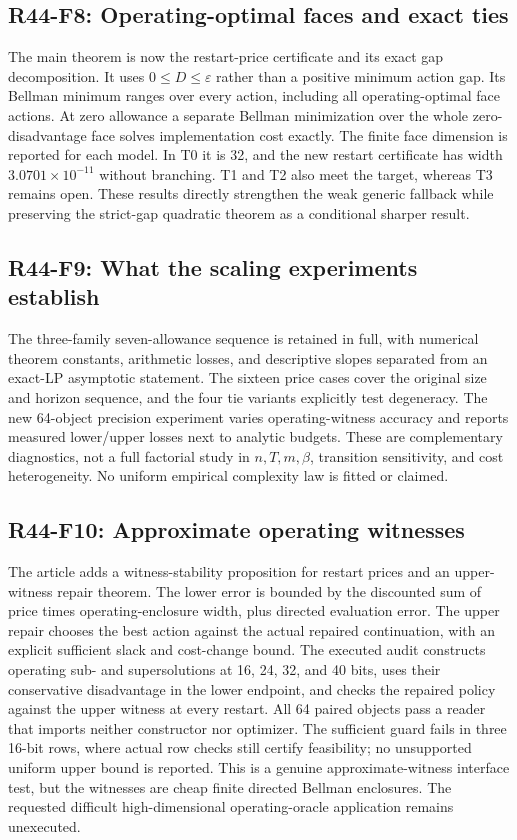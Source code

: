 \subsection{R44-F8: Operating-optimal faces and exact ties}
The main theorem is now the restart-price certificate and its exact gap decomposition. It uses $0\le D\le\varepsilon$ rather than a positive minimum action gap. Its Bellman minimum ranges over every action, including all operating-optimal face actions. At zero allowance a separate Bellman minimization over the whole zero-disadvantage face solves implementation cost exactly. The finite face dimension is reported for each model. In T0 it is 32, and the new restart certificate has width $3.0701\times10^{-11}$ without branching. T1 and T2 also meet the target, whereas T3 remains open. These results directly strengthen the weak generic fallback while preserving the strict-gap quadratic theorem as a conditional sharper result.

\subsection{R44-F9: What the scaling experiments establish}
The three-family seven-allowance sequence is retained in full, with numerical theorem constants, arithmetic losses, and descriptive slopes separated from an exact-LP asymptotic statement. The sixteen price cases cover the original size and horizon sequence, and the four tie variants explicitly test degeneracy. The new 64-object precision experiment varies operating-witness accuracy and reports measured lower/upper losses next to analytic budgets. These are complementary diagnostics, not a full factorial study in $n,T,m,\beta$, transition sensitivity, and cost heterogeneity. No uniform empirical complexity law is fitted or claimed.

\subsection{R44-F10: Approximate operating witnesses}
The article adds a witness-stability proposition for restart prices and an upper-witness repair theorem. The lower error is bounded by the discounted sum of price times operating-enclosure width, plus directed evaluation error. The upper repair chooses the best action against the actual repaired continuation, with an explicit sufficient slack and cost-change bound. The executed audit constructs operating sub- and supersolutions at 16, 24, 32, and 40 bits, uses their conservative disadvantage in the lower endpoint, and checks the repaired policy against the upper witness at every restart. All 64 paired objects pass a reader that imports neither constructor nor optimizer. The sufficient guard fails in three 16-bit rows, where actual row checks still certify feasibility; no unsupported uniform upper bound is reported. This is a genuine approximate-witness interface test, but the witnesses are cheap finite directed Bellman enclosures. The requested difficult high-dimensional operating-oracle application remains unexecuted.

